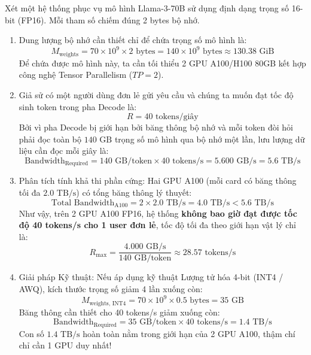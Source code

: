 \begin{example}
Xét một hệ thống phục vụ mô hình Llama-3-70B sử dụng định dạng trọng số 16-bit (FP16). Mỗi tham số chiếm đúng 2 bytes bộ nhớ.
\begin{enumerate}
  \item Dung lượng bộ nhớ cần thiết chỉ để chứa trọng số mô hình là:
  \begin{equation*}
  M_{\text{weights}} = 70 \times 10^9 \times 2\text{ bytes} = 140 \times 10^9\text{ bytes} \approx 130.38\text{ GiB}
  \end{equation*}
  Để chứa được mô hình này, ta cần tối thiểu 2 GPU A100/H100 80GB kết hợp công nghệ Tensor Parallelism ($TP=2$).
  
  \item Giả sử có một người dùng đơn lẻ gửi yêu cầu và chúng ta muốn đạt tốc độ sinh token trong pha Decode là:
  \begin{equation*}
  R = 40\text{ tokens/giây}
  \end{equation*}
  Bởi vì pha Decode bị giới hạn bởi băng thông bộ nhớ và mỗi token đòi hỏi phải đọc toàn bộ $140\text{ GB}$ trọng số mô hình qua bộ nhớ một lần, lưu lượng dữ liệu cần đọc mỗi giây là:
  \begin{equation*}
  \text{Bandwidth}_{\text{Required}} = 140\text{ GB/token} \times 40\text{ tokens/s} = 5.600\text{ GB/s} = 5.6\text{ TB/s}
  \end{equation*}
  
  \item Phân tích tính khả thi phần cứng:
  Hai GPU A100 (mỗi card có băng thông tối đa $2.0\text{ TB/s}$) có tổng băng thông lý thuyết:
  \begin{equation*}
  \text{Total Bandwidth}_{\text{A100}} = 2 \times 2.0\text{ TB/s} = 4.0\text{ TB/s} < 5.6\text{ TB/s}
  \end{equation*}
  Như vậy, trên 2 GPU A100 FP16, hệ thống \textbf{không bao giờ đạt được tốc độ 40 tokens/s cho 1 user đơn lẻ}, tốc độ tối đa theo giới hạn vật lý chỉ là:
  \begin{equation*}
  R_{\max} = \frac{4.000\text{ GB/s}}{140\text{ GB/token}} \approx 28.57\text{ tokens/s}
  \end{equation*}
  
  \item Giải pháp Kỹ thuật:
  Nếu áp dụng kỹ thuật Lượng tử hóa 4-bit (INT4 / AWQ), kích thước trọng số giảm 4 lần xuống còn:
  \begin{equation*}
  M_{\text{weights, INT4}} = 70 \times 10^9 \times 0.5\text{ bytes} = 35\text{ GB}
  \end{equation*}
  Băng thông cần thiết cho 40 tokens/s giảm xuống còn:
  \begin{equation*}
  \text{Bandwidth}_{\text{Required}} = 35\text{ GB/token} \times 40\text{ tokens/s} = 1.4\text{ TB/s}
  \end{equation*}
  Con số $1.4\text{ TB/s}$ hoàn toàn nằm trong giới hạn của 2 GPU A100, thậm chí chỉ cần 1 GPU duy nhất!
\end{enumerate}
\end{example}

